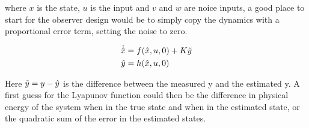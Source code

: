where $x$ is the state, $u$ is the input and $v$ and $w$ are noice inputs, a good place to start for the observer design would be to simply copy the dynamics with a proportional error term, setting the noise to zero.

\begin{align}
    \Dot{\hat{x}} &= f(\hat{x}, u, 0) + K\Tilde{y} \\
    \hat{y} &= h(\hat{x}, u, 0)
\end{align}

Here $\Tilde{y} = y -  \hat{y}$ is the difference between the measured y and the estimated y. A first guess for the Lyapunov function could then be the difference in physical energy of the system when in the true state and when in the estimated state, or the quadratic sum of the error in the estimated states. 